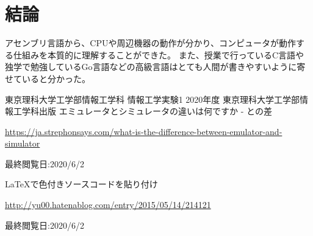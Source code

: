 \documentclass[12pt]{jarticle}
\begin{document}
\section{結論}

アセンブリ言語から、CPUや周辺機器の動作が分かり、コンピュータが動作する仕組みを本質的に理解することができた。
また、授業で行っているC言語や独学で勉強しているGo言語などの高級言語はとても人間が書きやすいように寄せていると分かった。

\begin{thebibliography}{99}
	\label{sannkoubunnkenn_chapter}
	東京理科大学工学部情報工学科 情報工学実験1 2020年度
	東京理科大学工学部情報工学科出版
	エミュレータとシミュレータの違いは何ですか - との差

	\url{https://ja.strephonsays.com/what-is-the-difference-between-emulator-and-simulator}

	最終閲覧日:2020/6/2

	LaTeXで色付きソースコードを貼り付け

	\url{http://yu00.hatenablog.com/entry/2015/05/14/214121}

	最終閲覧日:2020/6/2

\end{thebibliography}

\clearpage
\appendix
\end{document}
